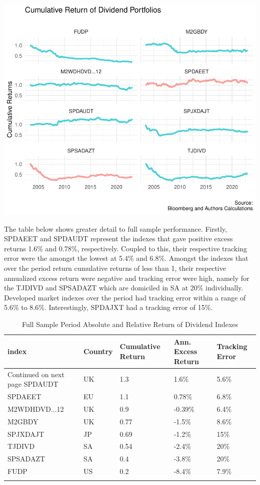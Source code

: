 \documentclass[11pt,preprint, authoryear]{elsarticle}
\let\origfigure\figure
\let\endorigfigure\endfigure
\renewenvironment{figure}[1][2] {
    \expandafter\origfigure\expandafter[H]
} {
    \endorigfigure
}
\numberwithin{equation}{section}
\numberwithin{figure}{section}
\numberwithin{table}{section}
\begin{document}
\begin{figure}[H]

{\centering \includegraphics{MuchAdoDivs_files/figure-latex/unnamed-chunk-1-1} 

}

\caption{Full Sample Cumulative Returns \label{fig1}}\label{fig:unnamed-chunk-1}
\end{figure}

The table below shows greater detail to full sample performance.
Firstly, SPDAEET and SPDAUDT represent the indexes that gave positive
excess returns 1.6\% and 0.78\%, respectively. Coupled to this, their
respective tracking error were the amongst the lowest at 5.4\% and
6.8\%. Amongst the indexes that over the period return cumulative
returns of less than 1, their respective annualized excess return were
negative and tracking error were high, namely for the TJDIVD and
SPSADAZT which are domiciled in SA at 20\% individually. Developed
market indexes over the period had tracking error within a range of
5.6\% to 8.6\%. Interestingly, SPDAJXT had a tracking error of 15\%.
\begingroup\fontsize{12pt}{13pt}\selectfont

\begin{longtable}{lllll}
  \toprule
index & Country & Cumulative Return & Ann. Excess Return & Tracking Error \\ 
  \hline 
\endhead 
\hline 
{\footnotesize Continued on next page} 
\endfoot 
\endlastfoot 
 \midrule
SPDAUDT & UK & 1.3 & 1.6\% & 5.6\% \\ 
  SPDAEET & EU & 1.1 & 0.78\% & 6.8\% \\ 
  M2WDHDVD...12 & UK & 0.9 & -0.39\% & 6.4\% \\ 
  M2GBDY & UK & 0.77 & -1.5\% & 8.6\% \\ 
  SPJXDAJT & JP & 0.69 & -1.2\% & 15\% \\ 
  TJDIVD & SA & 0.54 & -2.4\% & 20\% \\ 
  SPSADAZT & SA & 0.4 & -3.8\% & 20\% \\ 
  FUDP & US & 0.2 & -8.4\% & 7.9\% \\ 
   \bottomrule
\caption{Full Sample Period Absolute and Relative Return of Dividend Indexes} 
\end{longtable}
\endgroup
\end{document}
